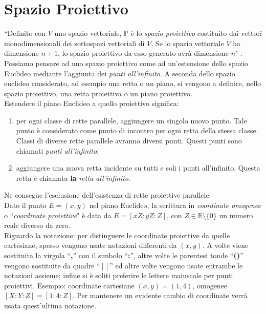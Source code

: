 \documentclass[a4paper,12pt]{tesiinfo}
\begin{document}
\section{Spazio Proiettivo}
``Definito con $V$ uno spazio vettoriale, $\mathbb{P}$ \`e lo \textit{spazio proiettivo} costituito dai vettori monodimensionali dei sottospazi vettoriali di $V$. Se lo spazio vettoriale $V$ ha dimensione $n+1$, lo spazio proiettivo da esso generato avr\`a dimensione $n$" \cite{baseTheory_ProjSpace}.
\\
Possiamo pensare ad uno spazio proiettivo come ad un'estensione dello spazio Euclideo mediante l'aggiunta dei \textit{punti all'infinito}. A seconda dello spazio euclideo considerato, ad esempio una retta o un piano, si vengono a definire, nello spazio proiettivo, una retta proiettiva o un piano proiettivo.
\\
Estendere il piano Euclideo \cite{baseTheory_Euclid2Proj_Space} a quello proiettivo significa:
\begin{enumerate}
 \item per ogni classe di rette parallele, aggiungere un singolo nuovo punto. Tale punto \`e considerato come punto di incontro per ogni retta della stessa classe. Classi di diverse rette parallele avranno diversi punti. Questi punti sono chiamati \textit{punti all'infinito};
 \item aggiungere una nuova retta incidente su tutti e soli i punti all'infinito. Questa retta \`e chiamata \textbf{la} \textit{retta all'infinito}.
\end{enumerate}
Ne consegue l'esclusione dell'esistenza di rette proiettive parallele.
\\
Dato il punto $E=(x, y)$ nel piano Euclideo, la scrittura in \textit{coordinate omogenee} o ``\textit{coordinate proiettive}" \`e data da $E=[xZ:yZ:Z]$, con $Z \in \mathbb{R} \setminus \{0\}$ un numero reale diverso da zero.
\\
Riguardo la notazione: per distinguere le coordinate proiettive da quelle cartesiane, spesso vengono usate notazioni differenti da $(x, y)$. A volte viene sostituita la virgola ``\textbf{,}'' con il simbolo ``\textbf{:}'', altre volte le parentesi tonde ``\textbf{()}'' vengono sostituite da quadre ``\textbf{$\mathbb{[]}$}'' ed altre volte vengono usate entrambe le notazioni assieme; infine si \`e soliti preferire le lettere maiuscole per punti proiettivi. Esempio: coordinate cartesiane $(x, y) = (1, 4)$, omogenee $[X:Y:Z]=[1:4:Z]$. Per mantenere un evidente cambio di coordinate verr\`a usata quest'ultima notazione.
\end{document}
